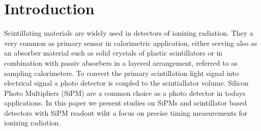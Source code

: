 \section{Introduction}

Scintillating materials are widely used in detectors of ionizing radiation. 
They a very common as primary sensor in calorimetric application, either serving also as an absorber material such 
as solid crystals of plastic scintillators or in combination with passiv absorbers in a layered arrangement, referred to as sampling calorimeters. To convert the primary scintillation light signal into electrical signal a photo detector is coupled to the scintiallator volume.
Silicon Photo Multipliers (SiPM) are a common choice as a photo detector in todays applications.
In this paper we present studies on SiPMs and scintillator based detectors with SiPM readout wiht a focus on precise timing measurements for ionizing radiation.
